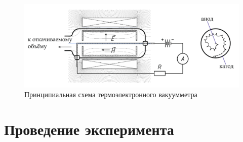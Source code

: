 \documentclass[14pt, a4paper]{report}
\begin{document}
\begin{figure}[!ht]
\centering
\includegraphics[scale=0.5]{terma5_06.png}
\caption{Принципиальная схема термоэлектронного вакуумметра}
\end{figure}

\section{Проведение эксперимента}
\end{document}
